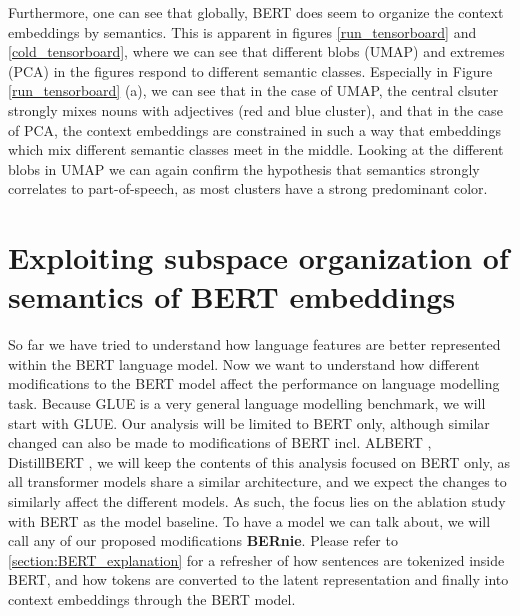 \documentclass[a4paper,12pt,twoside,openright]{report}
\begin{document}
Furthermore, one can see that globally, BERT does seem to organize the context embeddings by semantics. 
This is apparent in figures \eqref{run_tensorboard} and \eqref{cold_tensorboard}, where we can see that different blobs (UMAP) and extremes (PCA) in the figures respond to different semantic classes.
Especially in Figure \eqref{run_tensorboard} (a), we can see that in the case of UMAP, the central clsuter strongly mixes nouns with adjectives (red and blue cluster), and that in the case of PCA, the context embeddings are constrained in such a way that embeddings which mix different semantic classes meet in the middle.
Looking at the different blobs in UMAP we can again confirm the hypothesis that semantics strongly correlates to part-of-speech, as most clusters have a strong predominant color.


















\chapter{Exploiting subspace organization of semantics of BERT embeddings}


So far we have tried to understand how language features are better represented within the BERT language model.
Now we want to understand how different modifications to the BERT model affect the performance on language modelling task.
Because GLUE is a very general language modelling benchmark, we will start with GLUE.
Our analysis will be limited to BERT only, although similar changed can also be made to modifications of BERT incl. ALBERT \cite{lan20}, DistillBERT \cite{sanh19}, we will keep the contents of this analysis focused on BERT only, as all transformer models share a similar architecture, and we expect the changes to similarly affect the different models.
As such, the focus lies on the ablation study with BERT as the model baseline.
To have a model we can talk about, we will call any of our proposed modifications \textbf{BERnie}. 
Please refer to \eqref{section:BERT_explanation} for a refresher of how sentences are tokenized inside BERT, and how tokens are converted to the latent representation and finally into context embeddings through the BERT model.
\\
\end{document}
